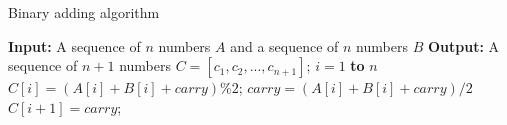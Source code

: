 \documentclass[review, authoryear, 3p, 12pt]{elsarticle}
\begin{document}
	\begin{algorithm}[htbp]
		\caption{Binary adding algorithm}
		\label{alg:tsh}
		\begin{codebox}
			\zi		\textbf{Input:} A sequence of $n$ numbers $A$ and a sequence of $n$ numbers $B$
			\zi 	\textbf{Output:} A sequence of $n+1$ numbers $C = [c_1, c_2, . . . , c_{n+1}]$;
			\li 	\For $i=1$ \textbf{to} $n$
					\Do
			\li 		$C[i]=(A[i]+B[i]+carry)\%2$;
			\li 		$carry=(A[i]+B[i]+carry)/2$
					\End
			\li		$C[i+1]=carry$;
		\end{codebox}
	\end{algorithm}
\end{document}
